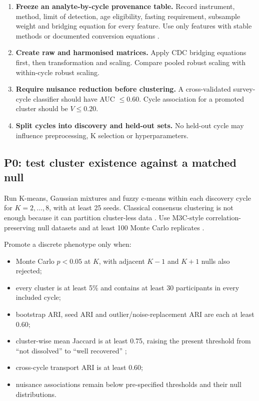 \documentclass[11pt,a4paper]{article}
\begin{document}
\begin{enumerate}
  \item \textbf{Freeze an analyte-by-cycle provenance table.} Record instrument,
  method, limit of detection, age eligibility, fasting requirement, subsample
  weight and bridging equation for every feature. Use only features with stable
  methods or documented conversion equations \citep{nhanesQuality}.
  \item \textbf{Create raw and harmonised matrices.} Apply CDC bridging equations
  first, then transformation and scaling. Compare pooled robust scaling with
  within-cycle robust scaling.
  \item \textbf{Require nuisance reduction before clustering.} A cross-validated
  survey-cycle classifier should have AUC \(\leq 0.60\). Cycle association for a
  promoted cluster should be \(V \leq 0.20\).
  \item \textbf{Split cycles into discovery and held-out sets.} No held-out cycle
  may influence preprocessing, K selection or hyperparameters.
\end{enumerate}

\subsection{P0: test cluster existence against a matched null}

Run K-means, Gaussian mixtures and fuzzy c-means within each discovery cycle for
\(K=2,\ldots,8\), with at least 25 seeds. Classical consensus clustering is not
enough because it can partition cluster-less data \citep{senbabaoglu2014}. Use
M3C-style correlation-preserving null datasets and at least 100 Monte Carlo
replicates \citep{m3c2020}.

Promote a discrete phenotype only when:

\begin{itemize}
  \item Monte Carlo \(p<0.05\) at \(K\), with adjacent \(K-1\) and \(K+1\)
  nulls also rejected;
  \item every cluster is at least 5\% and contains at least 30 participants in
  every included cycle;
  \item bootstrap ARI, seed ARI and outlier/noise-replacement ARI are each
  at least 0.60;
  \item cluster-wise mean Jaccard is at least 0.75, raising the present threshold
  from ``not dissolved'' to ``well recovered'' \citep{hennig2007};
  \item cross-cycle transport ARI is at least 0.60;
  \item nuisance associations remain below pre-specified thresholds and their
  null distributions.
\end{itemize}
\end{document}
